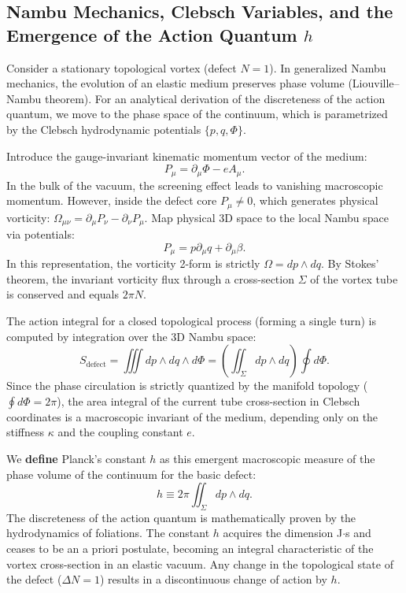 \documentclass[11pt,a4paper]{article}
\begin{document}
\subsection{Nambu Mechanics, Clebsch Variables, and the Emergence of the Action Quantum $h$}
Consider a stationary topological vortex (defect $N=1$). In generalized Nambu mechanics, the evolution of an elastic medium preserves phase volume (Liouville–Nambu theorem). For an analytical derivation of the discreteness of the action quantum, we move to the phase space of the continuum, which is parametrized by the Clebsch hydrodynamic potentials $\{p, q, \Phi\}$.

Introduce the gauge-invariant kinematic momentum vector of the medium:
\begin{equation}
P_\mu = \partial_\mu \Phi - e A_\mu.
\end{equation}
In the bulk of the vacuum, the screening effect leads to vanishing macroscopic momentum. However, inside the defect core $P_\mu \neq 0$, which generates physical vorticity: $\Omega_{\mu\nu} = \partial_\mu P_\nu - \partial_\nu P_\mu$. Map physical 3D space to the local Nambu space via potentials:
\begin{equation}
P_\mu = p \partial_\mu q + \partial_\mu \beta.
\end{equation}
In this representation, the vorticity 2-form is strictly $\Omega = dp \wedge dq$. By Stokes' theorem, the invariant vorticity flux through a cross-section $\Sigma$ of the vortex tube is conserved and equals $2\pi N$.

The action integral for a closed topological process (forming a single turn) is computed by integration over the 3D Nambu space:
\begin{equation}
S_{\text{defect}} = \iiint dp \wedge dq \wedge d\Phi = \left( \iint_\Sigma dp \wedge dq \right) \oint d\Phi.
\end{equation}
Since the phase circulation is strictly quantized by the manifold topology ($\oint d\Phi = 2\pi$), the area integral of the current tube cross-section in Clebsch coordinates is a macroscopic invariant of the medium, depending only on the stiffness $\kappa$ and the coupling constant $e$.

We \textbf{define} Planck's constant $h$ as this emergent macroscopic measure of the phase volume of the continuum for the basic defect:
\begin{equation}
h \equiv 2\pi \iint_\Sigma dp \wedge dq.
\end{equation}
The discreteness of the action quantum is mathematically proven by the hydrodynamics of foliations. The constant $h$ acquires the dimension J$\cdot$s and ceases to be an a priori postulate, becoming an integral characteristic of the vortex cross-section in an elastic vacuum. Any change in the topological state of the defect ($\Delta N = 1$) results in a discontinuous change of action by $h$.
\end{document}
